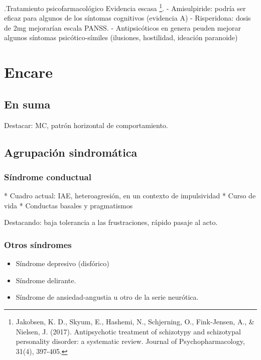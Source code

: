 .Tratamiento psicofarmacológico
Evidencia escasa \footnote{Jakobsen, K. D., Skyum, E., Hashemi, N., Schjerning, O., Fink-Jensen, A., \& Nielsen, J. (2017). Antipsychotic treatment of schizotypy and schizotypal personality disorder: a systematic review. Journal of Psychopharmacology, 31(4), 397-405.}.
- Amisulpiride: podría ser eficaz para algunos de los síntomas cognitivos (evidencia A)
- Risperidona: dosis de 2mg mejorarían escala PANSS.
- Antipsicóticos en genera peuden mejorar algunos síntomas psicótico-símiles (ilusiones, hostilidad, ideación paranoide)
\section*{Encare}
\subsection*{En suma}
Destacar: MC, patrón horizontal de comportamiento.
\subsection*{Agrupación sindromática}
\subsubsection*{Síndrome conductual}
* Cuadro actual: IAE, heteroagresión, en un contexto de impulsividad
* Curso de vida
* Conductas basales y pragmatismos

Destacando: baja tolerancia a las frustraciones, rápido pasaje al acto.
\subsubsection*{Otros síndromes}
\begin{itemize}
    \item Síndrome depresivo (disfórico)
    \item Síndrome delirante.
    \item Síndrome de ansiedad-angustia u otro de la serie neurótica.
\end{itemize}
